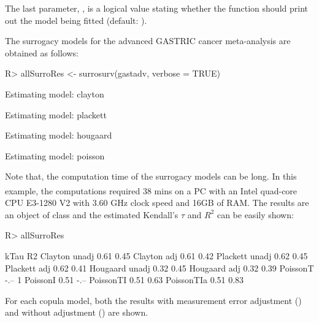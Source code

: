 \documentclass[article,shortnames, nojss]{jss}\usepackage[]{graphicx}\usepackage[]{color}
\begin{document}
  The last parameter, , is a logical value
  stating whether the function should print out the model being fitted
  (default: ).
  
  
  The surrogacy models for the advanced GASTRIC cancer meta-analysis
  are obtained as follows:
\begin{Schunk}
\begin{Sinput}
R> allSurroRes <-  surrosurv(gastadv, verbose = TRUE)
\end{Sinput}
\begin{Soutput}
Estimating model: clayton
\end{Soutput}
\begin{Soutput}
Estimating model: plackett
\end{Soutput}
\begin{Soutput}
Estimating model: hougaard
\end{Soutput}
\begin{Soutput}
Estimating model: poisson
\end{Soutput}
\end{Schunk}
Note that, the computation time of the surrogacy models can be long.
In this example, the computations required
  38
  mins
  on a PC with an Intel\textsuperscript{\textregistered} quad-core CPU E3-1280 V2
  with 3.60 GHz clock speed and 16GB of RAM.
The results are an object of class 
  and the estimated Kendall's $\tau$ and $R^2$ can be easily shown:
\begin{Schunk}
\begin{Sinput}
R>   allSurroRes
\end{Sinput}
\begin{Soutput}
               kTau R2  
Clayton unadj  0.61 0.45
Clayton adj    0.61 0.42
Plackett unadj 0.62 0.45
Plackett adj   0.62 0.41
Hougaard unadj 0.32 0.45
Hougaard adj   0.32 0.39
PoissonT       -.-- 1   
PoissonI       0.51 -.--
PoissonTI      0.51 0.63
PoissonTIa     0.51 0.83
\end{Soutput}
\end{Schunk}
For each copula model,
  both the results with measurement error adjustment ()
  and without adjustment () are shown.
\end{document}
